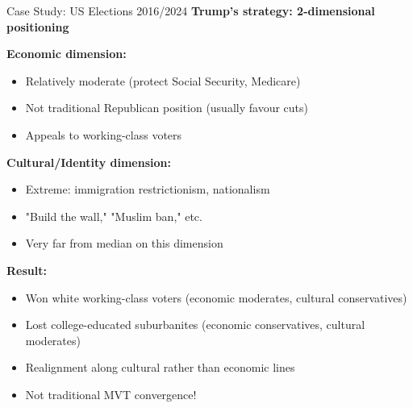 \documentclass[10pt]{beamer}
\begin{document}
\begin{frame}[allowframebreaks]{Case Study: US Elections 2016/2024}
\textbf{Trump's strategy: 2-dimensional positioning}



\textbf{Economic dimension:}
\begin{itemize}
\item Relatively moderate (protect Social Security, Medicare)
\item Not traditional Republican position (usually favour cuts)
\item Appeals to working-class voters
\end{itemize}



\textbf{Cultural/Identity dimension:}
\begin{itemize}
\item Extreme: immigration restrictionism, nationalism
\item "Build the wall," "Muslim ban," etc.
\item Very far from median on this dimension
\end{itemize}


  \framebreak  
\textbf{Result:}
\begin{itemize}
\item Won white working-class voters (economic moderates, cultural conservatives)
\item Lost college-educated suburbanites (economic conservatives, cultural moderates)
\item \alert{Realignment along cultural rather than economic lines}
\item Not traditional MVT convergence!
\end{itemize}
\end{frame}
\end{document}
